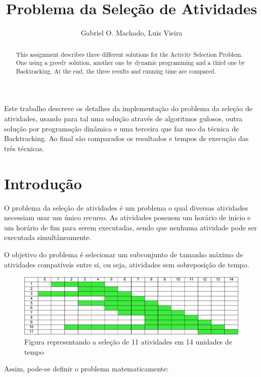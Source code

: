 \documentclass[12pt]{article}
\title{Problema da Seleção de Atividades}
\author{Gabriel O. Machado\inst{1}, Luis Vieira\inst{2}}
\begin{document}
 

\maketitle

\begin{abstract}
	This assignment describes three different solutions for the Activity Selection Problem. One using a greedy solution, 
	another one by dynamic programming and a third one by Backtracking.
	At the end, the three results and running time are compared.
\end{abstract}
     
\begin{resumo} 
	Este trabalho descreve os detalhes da implementação do problema da seleção de atividades, 
	usando para tal uma solução através de algoritmos gulosos, outra solução por programação dinâmica
	e uma terceira que faz uso da técnica de Backtracking.
	Ao final são comparados os resultados e tempos de execução das três técnicas.
	
\end{resumo}


\section{Introdução}
O problema da seleção de atividades é um problema o qual diversas atividades necessiam usar um único recurso. As atividades possuem um horário de início e um horário de fim para serem executadas, sendo que nenhuma atividade pode ser executada simultâneamente.

O objetivo do problema é selecionar um subconjunto de tamanho máximo de atividades compatíveis entre si, ou seja, atividades sem sobreposição de tempo.

\begin{figure}[ht]
\centering
\includegraphics[width=.5\textwidth]{selecao}
\caption{Figura representando a seleção de 11 atividades em 14 unidades de tempo}
\label{fig:selecao}
\end{figure}

Assim, pode-se definir o problema matematicamente:
\end{document}
